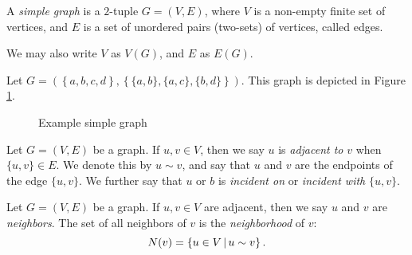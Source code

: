 \begin{defn}
    A \emph{simple graph} is a $2$-tuple $G = (V, E)$, where $V$ is a non-empty finite set of vertices, and $E$ is a set of unordered pairs (two-sets) of vertices, called edges.
\end{defn}

\begin{rmk}
    We may also write $V$ as $V(G)$, and $E$ as $E(G)$.
\end{rmk}

\begin{exmp} Let $G = \left(\left\{a, b, c, d\right\}, \left\{\{a, b\}, \{a, c\}, \{b, d\}\right\}\right)$. This graph is depicted in Figure \ref{fig:example-simple-graph}.
\end{exmp}

\begin{figure}[ht!]
    \centering
\caption{Example simple graph}
\label{fig:example-simple-graph}
\end{figure}

\begin{defn}
    Let $G = (V, E)$ be a graph. If $u, v \in V$, then we say $u$ is \emph{adjacent to} $v$ when $\{u, v\} \in E$. We denote this by $u \sim v$, and say that $u$ and $v$ are the endpoints of the edge $\{u, v\}$. We further say that $u$ or $b$ is \emph{incident on} or \emph{incident with} $\{u, v\}$.
\end{defn}

\begin{defn}
    Let $G = (V, E)$ be a graph. If $u, v \in V$ are adjacent, then we say $u$ and $v$ are \emph{neighbors}. The set of all neighbors of $v$ is the \emph{neighborhood} of $v$:
    \[N(v) = \left\{u \in V \,\middle|\, u \sim v \right\}.\]
\end{defn}

